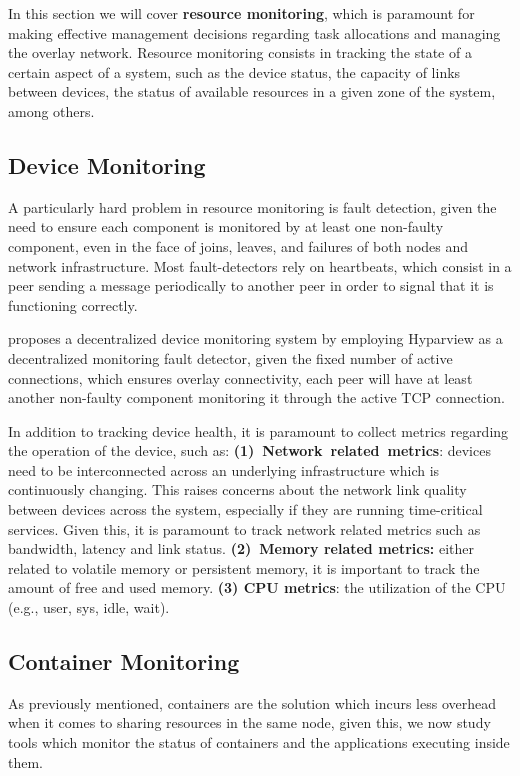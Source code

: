 
In this section we will cover \textbf{resource monitoring}, which is paramount for making effective management decisions regarding task allocations and managing the overlay network. Resource monitoring consists in tracking the state of a certain aspect of a system, such as the device status, the capacity of links between devices, the status of available resources in a given zone of the system, among others. 

\subsection{Device Monitoring}

A particularly hard problem in resource monitoring is fault detection, given the need to ensure each component is monitored by at least one non-faulty component, even in the face of joins, leaves, and failures of both nodes and network infrastructure. Most fault-detectors rely on heartbeats, which consist in a peer sending a message periodically to another peer in order to signal that it is functioning correctly.

\textcite{leitao2008large} proposes a decentralized device monitoring system by employing Hyparview \cite{Hyparview} as a decentralized monitoring fault detector, given the fixed number of active connections, which ensures overlay connectivity, each peer will have at least another non-faulty component monitoring it through the active TCP connection. 

In addition to tracking device health, it is paramount to collect metrics regarding the operation of the device, such as: \textbf{(1)~Network~related~metrics}: devices need to be interconnected across an underlying infrastructure which is continuously changing. This raises concerns about the network link quality between devices across the system, especially if they are running time-critical services. Given this, it is paramount to track network related metrics such as bandwidth, latency and link status. \textbf{(2)~Memory related metrics:} either related to volatile memory or persistent memory, it is important to track the amount of free and used memory. \textbf{(3) CPU metrics}: the utilization of the CPU (e.g., user, sys, idle, wait).

\subsection{Container Monitoring}

As previously mentioned, containers are the solution which incurs less overhead when it comes to sharing resources in the same node, given this, we now study tools which monitor the status of containers and the applications executing inside them. 

